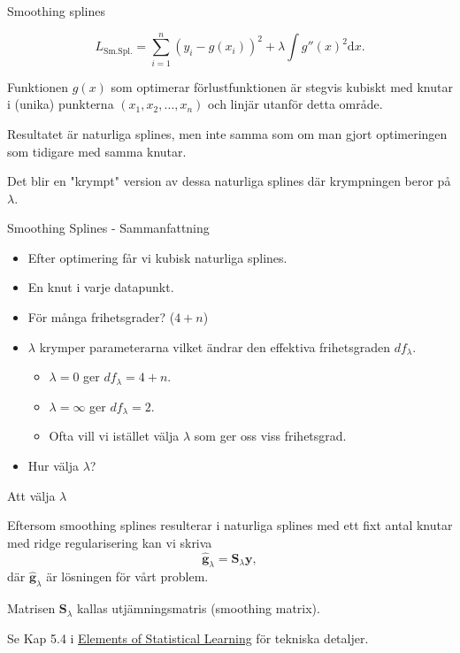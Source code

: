\documentclass[10pt,english]{beamer}
\begin{document}
\begin{frame}{Smoothing splines}

    \begin{equation*}
        L_{\text{Sm.Spl.}} = \sum_{i=1}^{n}(y_i - g(x_i))^2 + \lambda \int g''(x)^2 \mathrm{d}x.
    \end{equation*}

    \begin{bluebox}
        Funktionen $g(x)$ som optimerar förlustfunktionen är stegvis kubiskt med knutar i (unika) punkterna $(x_1, x_2, \ldots, x_n)$ och linjär utanför detta område.
    \end{bluebox}

    Resultatet är naturliga splines, men inte samma som om man gjort optimeringen som tidigare med samma knutar.

    Det blir en "krympt" version av dessa naturliga splines där krympningen beror på $\lambda$.
    
\end{frame}

\begin{frame}{Smoothing Splines - Sammanfattning}

    \begin{itemize}
        \item Efter optimering får vi kubisk naturliga splines.
        \item En knut i varje datapunkt.
        \item För många frihetsgrader? ($4+n$)
        \item $\lambda$ krymper parameterarna vilket ändrar den effektiva frihetsgraden $df_{\lambda}$.
        \begin{itemize}
            \item $\lambda = 0$ ger $df_{\lambda} = 4+n$.
            \item $\lambda = \infty$ ger $df_{\lambda} = 2$.
            \item Ofta vill vi istället välja $\lambda$ som ger oss viss frihetsgrad.
        \end{itemize}
        \item Hur välja $\lambda$?
    \end{itemize}
    
\end{frame}

\begin{frame}{Att välja $\lambda$}
    
    Eftersom smoothing splines resulterar i naturliga splines med ett fixt antal knutar med ridge regularisering kan vi skriva
    \begin{equation*}
        \hat{\mathbf{g}}_{\lambda} = \mathbf{S}_{\lambda} \mathbf{y},
    \end{equation*}
    där $\hat{\mathbf{g}}_{\lambda}$ är lösningen för vårt problem.

    Matrisen $\mathbf{S}_{\lambda}$ kallas utjämningsmatris (smoothing matrix).

    Se Kap 5.4 i \href{https://hastie.su.domains/ElemStatLearn/}{Elements of Statistical Learning} för tekniska detaljer.

\end{frame}
\end{document}
